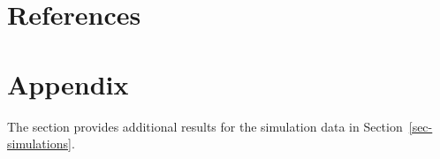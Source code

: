 \documentclass[
  12pt,
  11pt]{article}
\begin{document}
\hypertarget{references}{%
\section*{References}\label{references}}

\renewcommand{\bibsection}{}


\newpage
\appendix
\setcounter{section}{0}
\renewcommand{\thesection}{\Alph{section}}
\renewcommand{\thefigure}{A\arabic{figure}}
\renewcommand{\thetable}{A\arabic{table}}
\setcounter{figure}{0}
\setcounter{table}{0}

\hypertarget{appendix}{%
\section*{Appendix}\label{appendix}}

The section provides additional results for the simulation data in
Section~\ref{sec-simulations}.
\end{document}
